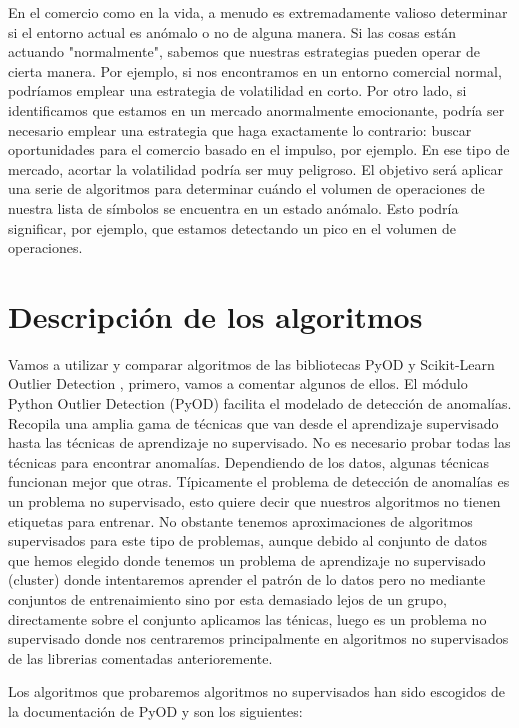 \documentclass[12pt,twoside]{report}
\begin{document}
En el comercio como en la vida, a menudo es extremadamente valioso determinar si el entorno actual es anómalo o no de alguna manera. Si las cosas están actuando "normalmente", sabemos que nuestras estrategias pueden operar de cierta manera. Por ejemplo, si nos encontramos en un entorno comercial normal, podríamos emplear una estrategia de volatilidad en corto. Por otro lado, si identificamos que estamos en un mercado anormalmente emocionante, podría ser necesario emplear una estrategia que haga exactamente lo contrario: buscar oportunidades para el comercio basado en el impulso, por ejemplo. En ese tipo de mercado, acortar la volatilidad podría ser muy peligroso. El objetivo será aplicar una serie de algoritmos para determinar cuándo el volumen de operaciones de nuestra lista de símbolos se encuentra en un estado anómalo. Esto podría significar, por ejemplo, que estamos detectando un pico en el volumen de operaciones.

\chapter*{Descripción de los algoritmos}

Vamos a utilizar y comparar algoritmos de las bibliotecas PyOD \cite{pyod} y Scikit-Learn Outlier Detection \cite{sklearn}, primero, vamos a comentar algunos de ellos. El módulo Python Outlier Detection (PyOD) facilita el modelado de detección de anomalías. Recopila una amplia gama de técnicas que van desde el aprendizaje supervisado hasta las técnicas de aprendizaje no supervisado. No es necesario probar todas las técnicas para encontrar anomalías. Dependiendo de los datos, algunas técnicas funcionan mejor que otras. Típicamente el problema de detección de anomalías es un problema no supervisado, esto quiere decir que nuestros algoritmos no tienen etiquetas para entrenar. No obstante tenemos aproximaciones de algoritmos supervisados para este tipo de problemas, aunque debido al conjunto de datos que hemos elegido donde tenemos un problema de aprendizaje no supervisado (cluster) donde intentaremos aprender el patrón de lo datos pero no mediante conjuntos de entrenaimiento sino por esta demasiado lejos de un grupo, directamente sobre el conjunto aplicamos las ténicas, luego es un problema no supervisado donde nos centraremos principalmente en algoritmos no supervisados de las librerias comentadas anterioremente. 

Los algoritmos que probaremos algoritmos no supervisados han sido escogidos de la documentación de PyOD \cite{lista} y son los siguientes:
\end{document}
